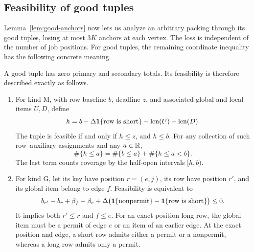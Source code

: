\subsection{Feasibility of good tuples}

Lemma~\ref{lem:good-anchors} now lets us analyze an arbitrary packing
through its good tuples, losing at most $3K$ anchors at each vertex.
The loss is independent of the number of job positions. For good
tuples, the remaining coordinate inequality has the following concrete
meaning.

\begin{lemma}\label{lem:good-feasibility}
A good tuple has zero primary and secondary totals. Its feasibility is
therefore described exactly as follows.
\begin{enumerate}
 \item For kind $\mathrm M$, with row baseline $b$, deadline $z$,
       and associated global and local items $U,D$, define
       \begin{equation}\label{eq:completion-coordinate}
        h=b-\Delta\mathbf{1}\{\text{row is short}\}-\operatorname{len}(U)-\operatorname{len}(D).
       \end{equation}
       The tuple is feasible if and only if $h\le z$, and $h\le b$.
       For any collection of such row--auxiliary assignments and any
       $a\in\mathbb R$,
       \begin{equation}\label{eq:completion-prefix}
        \#\{h\le a\}=\#\{b\le a\}+\#\{h\le a<b\}.
       \end{equation}
       The last term counts coverage by the half-open intervals $[h,b)$.
 \item For kind $\mathrm G$, let its key have position $r=(e,j)$,
       its row have position $r'$, and its global item belong to edge
       $f$. Feasibility is equivalent to
       \begin{equation}\label{eq:key-feasibility}
        b_{r'}-b_r+\beta_f-\beta_e
        +\Delta\bigl(\mathbf{1}\{\text{nonpermit}\}
                      -\mathbf{1}\{\text{row is short}\}\bigr)\le0.
       \end{equation}
       It implies both $r'\le r$ and $f\le e$. For an exact-position
       long row, the global item must be a permit of edge $e$ or an
       item of an earlier edge. At the exact position and edge, a
       short row admits either a permit or a nonpermit, whereas a long
       row admits only a permit.
\end{enumerate}
\end{lemma}

